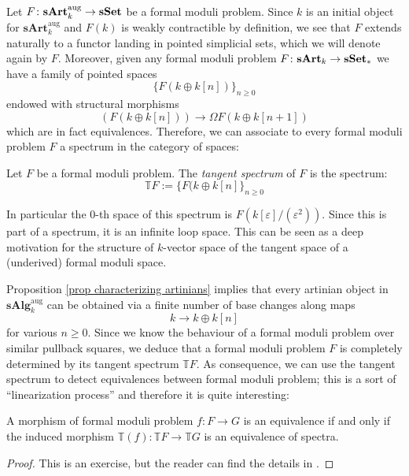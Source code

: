 \begin{refsection}
Let $F \colon \mathbf{sArt}_k^{\mathrm{aug}} \to \mathbf{sSet}$ be a formal moduli problem. Since $k$ is an initial object for $\mathbf{sArt}_k^{\mathrm{aug}}$ and $F(k)$ is weakly contractible by definition, we see that $F$ extends naturally to a functor landing in pointed simplicial sets, which we will denote again by $F$. Moreover, given any formal moduli problem $F \colon \mathbf{sArt}_k \to \mathbf{sSet}_*$ we have a family of pointed spaces
\[
\{F(k \oplus k[n])\}_{n \ge 0}
\]
endowed with structural morphisms
\[
(F(k \oplus k[n])) \to \Omega F(k \oplus k[n+1])
\]
which are in fact equivalences. Therefore, we can associate to every formal moduli problem $F$ a spectrum in the category of spaces:

\begin{defin}
Let $F$ be a formal moduli problem. The \emph{tangent spectrum} of $F$ is the spectrum:
\[
\mathbb T F := \{F(k \oplus k[n]\}_{n \ge 0}
\]
\end{defin}

\begin{rmk}
In particular the $0$-th space of this spectrum is $F(k[\varepsilon]/(\varepsilon^2))$. Since this is part of a spectrum, it is an infinite loop space. This can be seen as a deep motivation for the structure of $k$-vector space of the tangent space of a (underived) formal moduli space.
\end{rmk}

Proposition \ref{prop characterizing artinians} implies that every artinian object in $\mathbf{sAlg}_k^{\mathrm{aug}}$ can be obtained via a finite number of base changes along maps
\[
k \to k \oplus k[n]
\]
for various $n \ge 0$. Since we know the behaviour of a formal moduli problem over similar pullback squares, we deduce that a formal moduli problem $F$ is completely determined by its tangent spectrum $\mathbb T F$. As consequence, we can use the tangent spectrum to detect equivalences between formal moduli problem; this is a sort of ``linearization process'' and therefore it is quite interesting:

\begin{prop}
A morphism of formal moduli problem $f \colon F \to G$ is an equivalence if and only if the induced morphism $\mathbb T(f) \colon \mathbb T F \to \mathbb T G$ is an equivalence of spectra.
\end{prop}

\begin{proof}
This is an exercise, but the reader can find the details in \cite[Proposition 1.2.10]{dagx}.
\end{proof}


\end{refsection}
